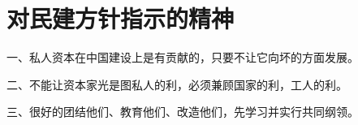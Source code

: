 \section[对民建方针指示的精神（一九五二年）]{对民建方针指示的精神}


一、私人资本在中国建设上是有贡献的，只要不让它向坏的方面发展。

二、不能让资本家光是图私人的利，必须兼顾国家的利，工人的利。

三、很好的团结他们、教育他们、改造他们，先学习并实行共同纲领。


